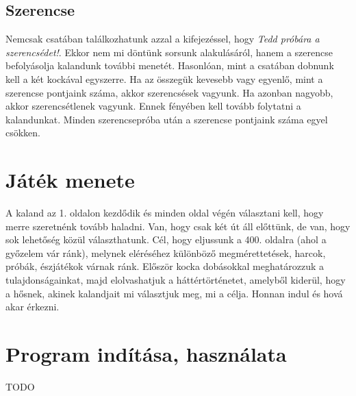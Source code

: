 \documentclass[12pt,a4paper,oneside]{report}
\begin{document}
      \subsection{Szerencse}
        Nemcsak csatában találkozhatunk azzal a kifejezéssel, hogy
        \emph{Tedd próbára a szerencsédet!}. Ekkor nem mi döntünk sorsunk
        alakulásáról, hanem a szerencse befolyásolja kalandunk további
        menetét. Hasonlóan, mint a csatában dobnunk kell a két kockával
        egyszerre. Ha az összegük kevesebb vagy egyenlő, mint a szerencse
        pontjaink száma, akkor szerencsések vagyunk. Ha azonban nagyobb, akkor
        szerencsétlenek vagyunk. Ennek fényében kell tovább folytatni a
        kalandunkat. Minden szerencsepróba után a szerencse pontjaink száma
        egyel csökken.
    
      \section{Játék menete}
        A kaland az 1. oldalon kezdődik és minden oldal végén választani kell,
        hogy merre szeretnénk tovább haladni. Van, hogy csak két út áll
        előttünk, de van, hogy sok lehetőség közül választhatunk. Cél, hogy
        eljussunk a 400. oldalra (ahol a győzelem vár ránk), melynek eléréséhez
        különböző megmérettetések, harcok, próbák, észjátékok várnak ránk.
        Először kocka dobásokkal meghatározzuk a tulajdonságainkat, majd
        elolvashatjuk a háttértörténetet, amelyből kiderül, hogy a hősnek,
        akinek kalandjait mi választjuk meg, mi a célja. Honnan indul és
        hová akar érkezni.
    \section{Program indítása, használata}
      TODO
\end{document}

